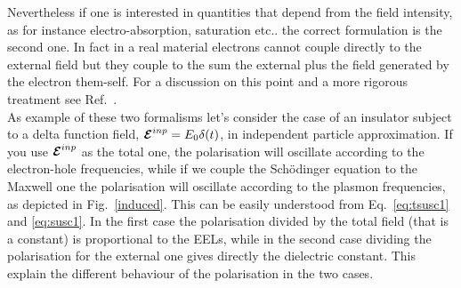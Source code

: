 Nevertheless if one is interested in quantities that depend from the field intensity, as for instance electro-absorption, saturation etc.. the correct formulation is the second one. In fact in a real material electrons cannot couple directly to the external field but they couple to the sum the external plus the field generated by the electron them-self. For a discussion on this point and a more rigorous treatment see Ref.~\cite{PhysRevB.85.045134}.\\
As example of these two formalisms let's consider the case of an insulator  subject to a delta function field,   $\boldsymbol{\cal E}^{inp} = E_0 \delta(t)$, in independent particle approximation. If you use $\boldsymbol{\cal E}^{inp}$ as the total one, the polarisation will oscillate according to the electron-hole frequencies, while if we couple the Sch\"odinger equation to the Maxwell one the polarisation will oscillate according to the plasmon frequencies, as depicted in Fig.~\ref{induced}. This can be easily understood from Eq.~\ref{eq:tsusc1} and \ref{eq:susc1}. In the first case the polarisation divided by the total field (that is a constant) is proportional to the EELs, while in the second case dividing the polarisation for the external one gives directly the dielectric constant. This explain the different behaviour of the polarisation in the two cases.  
